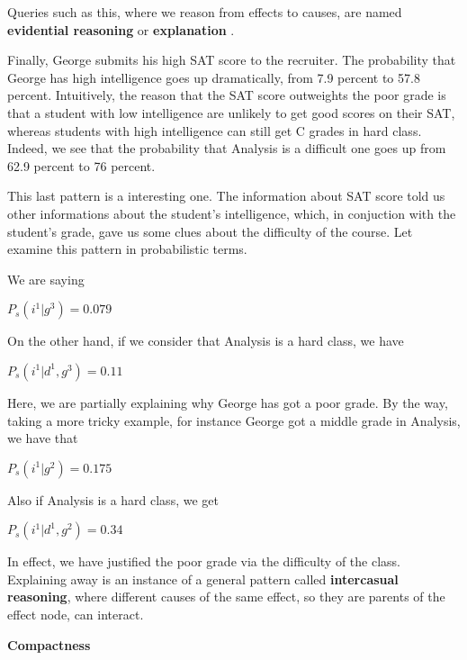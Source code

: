 \begin{example}
    Queries such as this, where we reason from effects to causes, are named \textbf{evidential reasoning} or \textbf{explanation} . \vspace{3.5pt}

    Finally, George submits his high SAT score to the recruiter. The probability that George has high intelligence goes up dramatically, from 7.9 percent to 57.8 percent. Intuitively, the reason that the SAT score 
    outweights the poor grade is that a student with low intelligence are unlikely to get good scores on their SAT, whereas students with high intelligence can still get C grades in hard class.
    Indeed, we see that the probability that Analysis is a difficult one goes up from 62.9 percent to 76 percent. \vspace{3.5pt} 

    This last pattern is a interesting one. The information about SAT score told us other informations about the student's intelligence, which, in conjuction with the student's grade, gave us some clues about the difficulty of the course. Let examine this pattern in probabilistic terms. \vspace{3.5pt}

    We are saying \vspace{3.5pt}

    $P_s(i^1|g^3) = 0.079$ \vspace{3.5pt}

    On the other hand, if we consider that Analysis is a hard class, we have \vspace{3.5pt}

    $P_s(i^1|d^1, g^3) = 0.11$ \vspace{3.5pt} 

    Here, we are partially explaining why George has got a poor grade. By the way, taking a more tricky example, for instance George got a middle grade in Analysis, we have that \vspace{3.5pt}

    $P_s(i^1|g^2) = 0.175$ \vspace{3.5pt}

    Also if Analysis is a hard class, we get \vspace{3.5pt} 

    $P_s(i^1|d^1, g^2) = 0.34$ \vspace{3.5pt} 

    In effect, we have justified the poor grade via the difficulty of the class. Explaining away is an instance of a general pattern called \textbf{intercasual reasoning},
    where different causes of the same effect, so they are parents of the effect node, can interact.     
\end{example}
\textbf{Compactness} \vspace{3.5pt}

